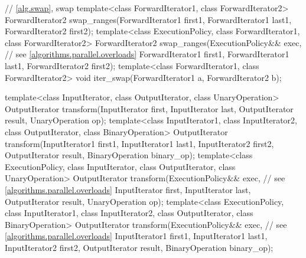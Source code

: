 \begin{codeblock}
{  // \ref{alg.swap}, swap
  template<class ForwardIterator1, class ForwardIterator2>
    ForwardIterator2 swap_ranges(ForwardIterator1 first1, ForwardIterator1 last1,
                                 ForwardIterator2 first2);
  template<class ExecutionPolicy, class ForwardIterator1, class ForwardIterator2>
    ForwardIterator2 swap_ranges(ExecutionPolicy&& exec, // see \ref{algorithms.parallel.overloads}
                                 ForwardIterator1 first1, ForwardIterator1 last1,
                                 ForwardIterator2 first2);
  template<class ForwardIterator1, class ForwardIterator2>
    void iter_swap(ForwardIterator1 a, ForwardIterator2 b);

  template<class InputIterator, class OutputIterator, class UnaryOperation>
    OutputIterator transform(InputIterator first, InputIterator last,
                             OutputIterator result, UnaryOperation op);
  template<class InputIterator1, class InputIterator2, class OutputIterator,
           class BinaryOperation>
    OutputIterator transform(InputIterator1 first1, InputIterator1 last1,
                             InputIterator2 first2, OutputIterator result,
                             BinaryOperation binary_op);
  template<class ExecutionPolicy, class InputIterator, class OutputIterator,
           class UnaryOperation>
    OutputIterator transform(ExecutionPolicy&& exec, // see \ref{algorithms.parallel.overloads}
                             InputIterator first, InputIterator last,
                             OutputIterator result, UnaryOperation op);
  template<class ExecutionPolicy, class InputIterator1, class InputIterator2,
           class OutputIterator, class BinaryOperation>
    OutputIterator transform(ExecutionPolicy&& exec, // see \ref{algorithms.parallel.overloads}
                             InputIterator1 first1, InputIterator1 last1,
                             InputIterator2 first2, OutputIterator result,
                             BinaryOperation binary_op);

}
\end{codeblock}
